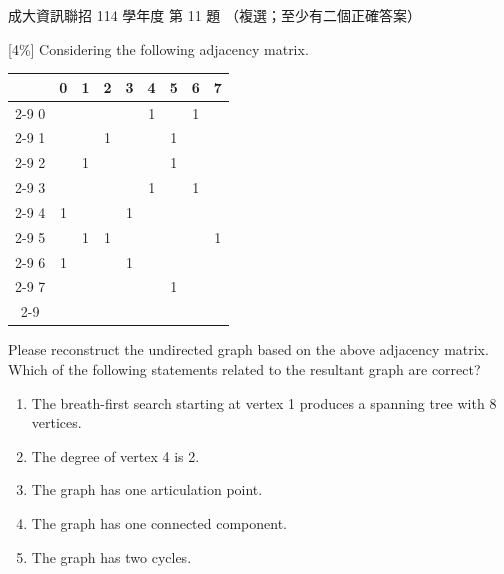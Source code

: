\begin{pastexam}[label={px:ncku-114-prog-11}]{成大資訊聯招 114 學年度 第 11 題}
（複選；至少有二個正確答案）

{[4\%]} Considering the following adjacency matrix.
\begin{center}
\begin{tabular}{c|*{8}{c|}}
\multicolumn{1}{c}{} & \multicolumn{1}{c}{0} & \multicolumn{1}{c}{1} & \multicolumn{1}{c}{2} & \multicolumn{1}{c}{3} & \multicolumn{1}{c}{4} & \multicolumn{1}{c}{5} & \multicolumn{1}{c}{6} & \multicolumn{1}{c}{7} \\ \cline{2-9}
0 &   &   &   &   & 1 &   & 1 &   \\ \cline{2-9}
1 &   &   & 1 &   &   & 1 &   &   \\ \cline{2-9}
2 &   & 1 &   &   &   & 1 &   &   \\ \cline{2-9}
3 &   &   &   &   & 1 &   & 1 &   \\ \cline{2-9}
4 & 1 &   &   & 1 &   &   &   &   \\ \cline{2-9}
5 &   & 1 & 1 &   &   &   &   & 1 \\ \cline{2-9}
6 & 1 &   &   & 1 &   &   &   &   \\ \cline{2-9}
7 &   &   &   &   &   & 1 &   &   \\ \cline{2-9}
\end{tabular}
\end{center}
\smallskip
Please reconstruct the undirected graph based on the above adjacency matrix. Which of the following statements related to the resultant graph are correct?
\begin{enumerate}[label=(\Alph*)]
\item The breath-first search starting at vertex 1 produces a spanning tree with 8 vertices.
\item The degree of vertex 4 is 2.
\item The graph has one articulation point.
\item The graph has one connected component.
\item The graph has two cycles.
\end{enumerate}
\end{pastexam}


